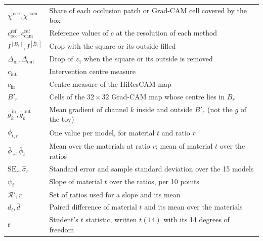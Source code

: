 \begin{longtable}{@{}p{}p{}@{}}
$\bar{\chi}^{\,\mathrm{occ}}, \bar{\chi}^{\,\mathrm{cam}}$ & Share of each occlusion patch or Grad-CAM cell covered by the box \\
$c^{\mathrm{ref}}_{\mathrm{occ}}, c^{\mathrm{ref}}_{\mathrm{cam}}$ & Reference values of $c$ at the resolution of each method \\
$I^{[B_r]}, I^{[\bar{B}_r]}$ & Crop with the square or its outside filled \\
$\Delta_{\mathrm{in}}, \Delta_{\mathrm{out}}$ & Drop of $z_1$ when the square or its outside is removed \\
$c_{\mathrm{int}}$ & Intervention centre measure \\
$c_{\mathrm{hr}}$ & Centre measure of the HiResCAM map \\
$B'_r$ & Cells of the $32 \times 32$ Grad-CAM map whose centre lies in $B_r$ \\
$\bar{g}^{\,\mathrm{in}}_k, \bar{g}^{\,\mathrm{out}}_k$ & Mean gradient of channel $k$ inside and outside $B'_r$ (not the $g$ of the toy) \\
$\phi_{t,r}$ & One value per model, for material $t$ and ratio $r$ \\
$\bar{\phi}_{\cdot r}, \bar{\phi}_{t\cdot}$ & Mean over the materials at ratio $r$; mean of material $t$ over the ratios \\
$\mathrm{SE}_r, \hat{\sigma}_r$ & Standard error and sample standard deviation over the 15 models \\
$\psi_t$ & Slope of material $t$ over the ratios, per 10 points \\
$\mathcal{R}', \bar{r}$ & Set of ratios used for a slope and its mean \\
$d_t, \bar{d}$ & Paired difference of material $t$ and its mean over the materials \\
$t$ & Student's $t$ statistic, written $t(14)$ with its 14 degrees of freedom \\
\bottomrule
\end{longtable}
\endgroup
